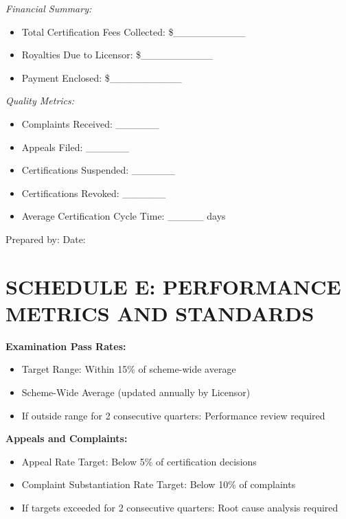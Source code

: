 \documentclass[11pt,a4paper]{article}
\begin{document}
\vspace{1em}

\textit{Financial Summary:}

\begin{itemize}
\item Total Certification Fees Collected: \$\_\_\_\_\_\_\_\_\_\_
\item Royalties Due to Licensor: \$\_\_\_\_\_\_\_\_\_\_
\item Payment Enclosed: \$\_\_\_\_\_\_\_\_\_\_
\end{itemize}

\vspace{1em}

\textit{Quality Metrics:}

\begin{itemize}
\item Complaints Received: \_\_\_\_\_\_
\item Appeals Filed: \_\_\_\_\_\_
\item Certifications Suspended: \_\_\_\_\_\_
\item Certifications Revoked: \_\_\_\_\_\_
\item Average Certification Cycle Time: \_\_\_\_\_ days
\end{itemize}

\vspace{1em}

Prepared by: \underline{\hspace{5cm}} Date: \underline{\hspace{3cm}}

\newpage

\section*{SCHEDULE E: PERFORMANCE METRICS AND STANDARDS}

\textbf{Examination Pass Rates:}

\begin{itemize}
\item Target Range: Within 15\% of scheme-wide average
\item Scheme-Wide Average (updated annually by Licensor)
\item If outside range for 2 consecutive quarters: Performance review required
\end{itemize}

\textbf{Appeals and Complaints:}

\begin{itemize}
\item Appeal Rate Target: Below 5\% of certification decisions
\item Complaint Substantiation Rate Target: Below 10\% of complaints
\item If targets exceeded for 2 consecutive quarters: Root cause analysis required
\end{itemize}
\end{document}

